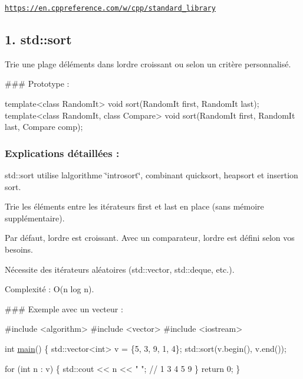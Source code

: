 \href{https://en.cppreference.com/w/cpp/standard_library}{\tt https\+://en.\+cppreference.\+com/w/cpp/standard\+\_\+library}

\subsection*{1. {\bfseries std\+::sort}}

Trie une plage d\textquotesingle{}éléments dans l\textquotesingle{}ordre croissant ou selon un critère personnalisé.

\#\#\# Prototype \+: 
\begin{DoxyCode}
\textcolor{keyword}{template}<\textcolor{keyword}{class} RandomIt>
\textcolor{keywordtype}{void} sort(RandomIt first, RandomIt last);
\textcolor{keyword}{template}<\textcolor{keyword}{class} RandomIt, \textcolor{keyword}{class} Compare>
\textcolor{keywordtype}{void} sort(RandomIt first, RandomIt last, Compare comp);
\end{DoxyCode}


\subsubsection*{Explications détaillées \+:}


\begin{DoxyItemize}
\item {\ttfamily std\+::sort} utilise l\textquotesingle{}algorithme \char`\"{}introsort\char`\"{}, combinant quicksort, heapsort et insertion sort.
\item Trie les éléments entre les itérateurs {\ttfamily first} et {\ttfamily last} en place (sans mémoire supplémentaire).
\item Par défaut, l\textquotesingle{}ordre est croissant. Avec un comparateur, l\textquotesingle{}ordre est défini selon vos besoins.
\item Nécessite des itérateurs aléatoires ({\ttfamily std\+::vector}, {\ttfamily std\+::deque}, etc.).
\item Complexité \+: O(n log n).
\end{DoxyItemize}

\#\#\# Exemple avec un vecteur \+: 
\begin{DoxyCode}
\textcolor{preprocessor}{#include <algorithm>}
\textcolor{preprocessor}{#include <vector>}
\textcolor{preprocessor}{#include <iostream>}

\textcolor{keywordtype}{int} \hyperlink{htop_8c_a3c04138a5bfe5d72780bb7e82a18e627}{main}() \{
    std::vector<int> v = \{5, 3, 9, 1, 4\};
    std::sort(v.begin(), v.end());

    \textcolor{keywordflow}{for} (\textcolor{keywordtype}{int} n : v) \{
        std::cout << n << \textcolor{stringliteral}{" "}; \textcolor{comment}{// 1 3 4 5 9}
    \}
    \textcolor{keywordflow}{return} 0;
\}
\end{DoxyCode}
 



